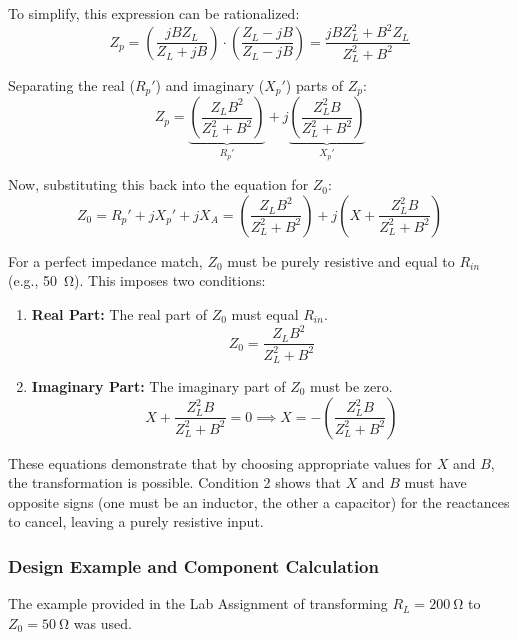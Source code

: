 To simplify, this expression can be rationalized:
\begin{equation}
    Z_p = \left( \frac{jB Z_L}{Z_L + jB} \right) \cdot \left( \frac{Z_L - jB}{Z_L - jB} \right) = \frac{jB Z_L^2 + B^2 Z_L}{Z_L^2 + B^2}
\end{equation}

Separating the real ($R_p'$) and imaginary ($X_p'$) parts of $Z_p$:
\begin{equation}
    Z_p = \underbrace{\left( \frac{Z_L B^2}{Z_L^2 + B^2} \right)}_{R_p'} + j \underbrace{\left( \frac{Z_L^2 B}{Z_L^2 + B^2} \right)}_{X_p'}
\end{equation}

Now, substituting this back into the equation for $Z_{0}$:
\begin{equation}
    Z_{0} = R_p' + jX_p' + jX_A = \left( \frac{Z_L B^2}{Z_L^2 + B^2} \right) + j \left( X + \frac{Z_L^2 B}{Z_L^2 + B^2} \right)
\end{equation}

For a perfect impedance match, $Z_{0}$ must be purely resistive and equal to $R_{in}$ (e.g., \SI{50}{\ohm}). This imposes two conditions:

\begin{enumerate}
    \item \textbf{Real Part:} The real part of $Z_{0}$ must equal $R_{in}$.
    \begin{equation}
        Z_{0} = \frac{Z_L B^2}{Z_L^2 + B^2}
    \end{equation}

    \item \textbf{Imaginary Part:} The imaginary part of $Z_{0}$ must be zero.
    \begin{equation}
        X + \frac{Z_L^2 B}{Z_L^2 + B^2} = 0 \implies X= - \left( \frac{Z_L^2 B}{Z_L^2 + B^2} \right)
    \end{equation}
\end{enumerate}

These equations demonstrate that by choosing appropriate values for $X$ and $B$, the transformation is possible. Condition 2 shows that $X$ and $B$ must have opposite signs (one must be an inductor, the other a capacitor) for the reactances to cancel, leaving a purely resistive input.

\subsubsection{Design Example and Component Calculation}
The example provided in the Lab Assignment of transforming $R_L = \SI{200}{\ohm}$ to $Z_{0} = \SI{50}{\ohm}$ was used. 

